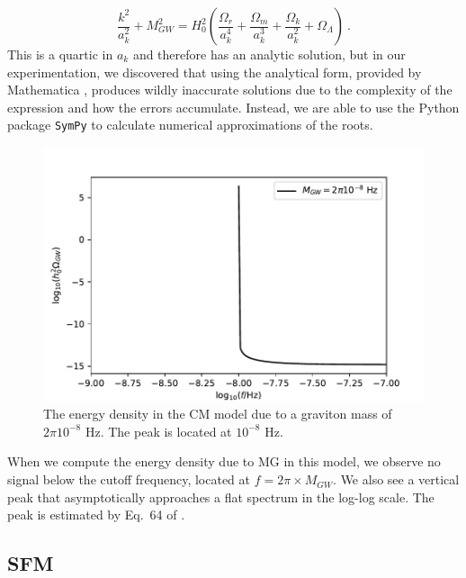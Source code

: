 \documentclass[prd,twocolumn,aps,psfig,nofootinbib,nobibnotes,superscriptaddress,preprintnumbers,times]{revtex4-2}
\begin{document}
\begin{equation}\label{eqn:19}
    \frac{k^2}{a_k^2} + M_{GW}^2 = H_0^2\left(\frac{\Omega_r}{a_k^4} + \frac{\Omega_m}{a_k^3}+ \frac{\Omega_k}{a_k^2}+\Omega_\Lambda\right) \ .
\end{equation}This is a quartic in $a_k$ and therefore has an analytic solution, but in our experimentation, we discovered that using the analytical form, provided by Mathematica \cite{Mathematica:2023}, produces wildly inaccurate solutions due to the complexity of the expression and how the errors accumulate. Instead, we are able to use the Python package \texttt{SymPy} \cite{SymPy:2017} to calculate numerical approximations of the roots.

\begin{figure}[h]
\includegraphics[scale=.565]{fig/fig6.pdf}
\caption{The energy density in the CM model due to a graviton mass of $2\pi 10^{-8}$ Hz. The peak is located at $10^{-8}$ Hz.}
\label{fig:CM_omega}
\end{figure}

When we compute the energy density due to MG in this model, we observe no signal below the cutoff frequency, located at $f = 2\pi\times M_{GW}$. We also see a vertical peak that asymptotically approaches a flat spectrum in the log-log scale. The peak is estimated by Eq.\ 64 of \cite{Gumrukcuoglu:2012}.

\subsection{SFM}
\end{document}
